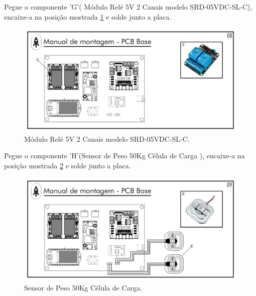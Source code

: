 \par Pegue o componente 'G'( Módulo Relé 5V 2 Canais modelo SRD-05VDC-SL-C), encaixe-a na posição mostrada \ref{fig:PCIBASE Módulo Relé 5V 2 Canais modelo SRD-05VDC-SL-C } e solde junto a placa.
\begin{figure}[H]
  \centering
  \includegraphics[width=\textwidth]{Figuras/BASE/Pg-08---PL-03.png}
  \caption{ Módulo Relé 5V 2 Canais modelo SRD-05VDC-SL-C.}
  \label{fig:PCIBASE Módulo Relé 5V 2 Canais modelo SRD-05VDC-SL-C }
\end{figure}
\newpage

\par Pegue o componente 'H'(Sensor de Peso 50Kg Célula de Carga ), encaixe-a na posição mostrada \ref{fig:PCIBASE Sensor de Peso 50Kg Célula de Carga  }   e solde junto a placa.
\begin{figure}[H]
  \centering
  \includegraphics[width=\textwidth]{Figuras/BASE/Pg-09---PL-03.png}
  \caption{Sensor de Peso 50Kg Célula de Carga.}
  \label{fig:PCIBASE Sensor de Peso 50Kg Célula de Carga  }
\end{figure}

